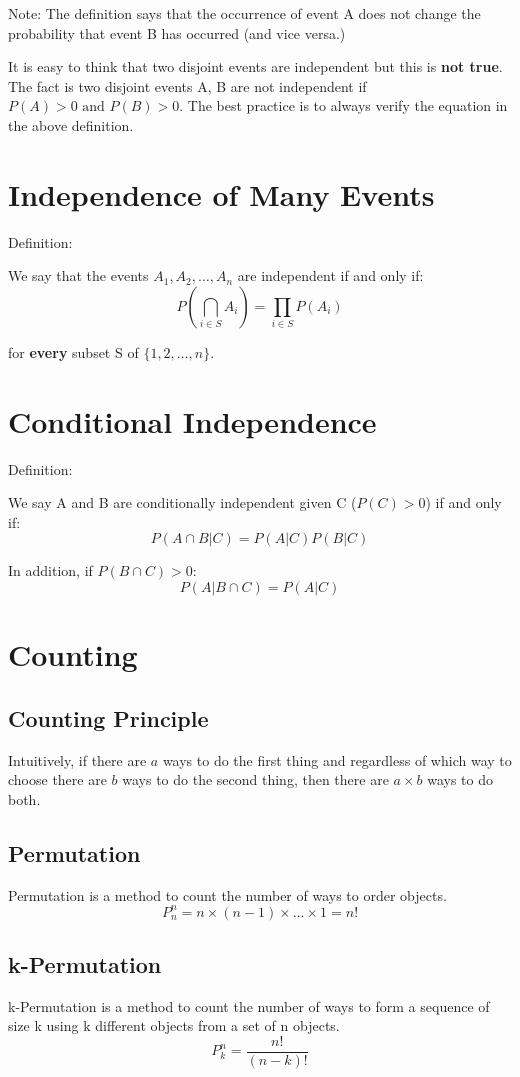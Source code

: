 \documentclass[11pt]{article}
\begin{document}
Note:
The definition says that the occurrence of event A does not change the probability that event B has occurred (and vice versa.)

It is easy to think that two disjoint events are independent but this is \textbf{not true}.
The fact is two disjoint events A, B are not independent if $P(A) > 0 \text{{ and }} P(B) > 0$.
The best practice is to always verify the equation in the above definition. 

\section{Independence of Many Events}
Definition:

We say that the events $A_1, A_2, \ldots, A_n$ are independent if and only if:
$$P(\bigcap_{i \in S}A_i) = \prod_{i \in S}P(A_i)$$

for \textbf{every} subset S of $\{1,2,\ldots, n\}$.

\section{Conditional Independence}
Definition:

We say A and B are conditionally independent given C ($P(C) > 0$) if and only if:
$$P(A \cap B | C) = P(A | C) P(B | C)$$

In addition, if $P(B \cap C) > 0$:
$$P(A | B \cap C) = P(A | C)$$


\section{Counting}
\subsection{Counting Principle}
Intuitively, if there are $a$ ways to do the first thing and regardless of which way to choose there are $b$ ways to do the second thing, then there are $a \times b$ ways to do both.

\subsection{Permutation}
Permutation is a method to count the number of ways to order objects.
$$P_n^{n} = n \times (n - 1) \times \ldots \times 1 = n!$$

\subsection{k-Permutation}
k-Permutation is a method to count the number of ways to form a sequence of size k using k different objects from a set of n objects.
$$P_k^{n} = \frac{n!}{(n-k)!}$$
\end{document}
